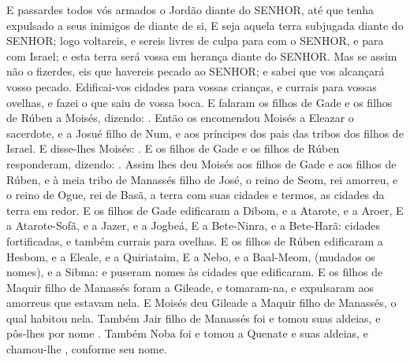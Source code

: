 {{  E passardes todos vós armados o Jordão diante do SENHOR, até que tenha expulsado a seus inimigos de diante de si,
  E seja aquela terra subjugada diante do SENHOR; logo voltareis, e sereis livres de culpa para com o SENHOR, e para com Israel; e esta terra será vossa em herança diante do SENHOR.
  Mas se assim não o fizerdes, eis que havereis pecado ao SENHOR; e sabei que vos alcançará vosso pecado.
  Edificai-vos cidades para vossas crianças, e currais para vossas ovelhas, e fazei o que saiu de vossa boca}.
  E falaram os filhos de Gade e os filhos de Rúben a Moisés, dizendo: .
  Então os encomendou Moisés a Eleazar o sacerdote, e a Josué filho de Num, e aos príncipes dos pais das tribos dos filhos de Israel.
  E disse-lhes Moisés: .
  E os filhos de Gade e os filhos de Rúben responderam, dizendo: .
  Assim lhes deu Moisés aos filhos de Gade e aos filhos de Rúben, e à meia tribo de Manassés filho de José, o reino de Seom, rei amorreu, e o reino de Ogue, rei de Basã, a terra com suas cidades e termos, as cidades da terra em redor.
  E os filhos de Gade edificaram a Dibom, e a Atarote, e a Aroer,
  E a Atarote-Sofã, e a Jazer, e a Jogbeá,
  E a Bete-Ninra, e a Bete-Harã: cidades fortificadas, e também currais para ovelhas.
  E os filhos de Rúben edificaram a Hesbom, e a Eleale, e a Quiriataim,
  E a Nebo, e a Baal-Meom, (mudados os nomes), e a Sibma: e puseram nomes às cidades que edificaram.
  E os filhos de Maquir filho de Manassés foram a Gileade, e tomaram-na, e expulsaram aos amorreus que estavam nela.
  E Moisés deu Gileade a Maquir filho de Manassés, o qual habitou nela.
  Também Jair filho de Manassés foi e tomou suas aldeias, e pôs-lhes por nome .
  Também Noba foi e tomou a Quenate e suas aldeias, e chamou-lhe , conforme seu nome.
\par }

